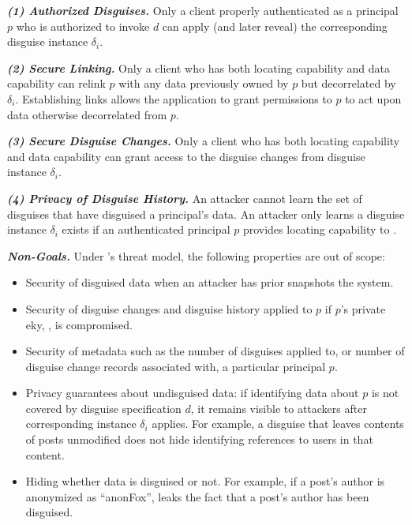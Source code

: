%
\vspace{6pt}\noindent\textbf{\emph{(1) Authorized Disguises.}}
%
Only a client properly authenticated as a principal $p$ who is authorized to invoke $d$ can apply (and
later reveal) the corresponding disguise instance $\delta_i$.
%

%
\vspace{6pt}\noindent\textbf{\emph{(2) Secure Linking.}}
%
Only a client who has both locating capability  and data capability  can relink $p$
with any data previously owned by $p$ but decorrelated by $\delta_i$.
Establishing links allows the application to grant permissions to $p$ to act upon data otherwise
decorrelated from $p$.
%

\vspace{6pt}\noindent\textbf{\emph{(3) Secure Disguise Changes.}}
%
Only a client who has both locating capability  and data capability
 can grant \sys access to the disguise changes from disguise instance $\delta_i$.
%

\vspace{6pt}\noindent\textbf{\emph{(4) Privacy of Disguise History.}}
%
An attacker cannot learn the set of disguises that have disguised a principal's data.
%
An attacker only learns a disguise instance $\delta_i$ exists if an authenticated principal $p$ provides
locating capability  to \sys.

\vspace{6pt}\noindent\textbf{\emph{Non-Goals.}}
%
Under \sys's threat model, the following properties are out of scope:
%
\begin{itemize}
    \item Security of disguised data when an attacker has prior snapshots the system.
    \item Security of disguise changes and disguise history applied to $p$ if $p$'s private eky, , is compromised.
    \item Security of metadata such as the number of disguises applied to, or number of
	disguise change records associated with, a particular principal $p$.
    \item Privacy guarantees about undisguised data: if identifying data about $p$ is not covered by
        disguise specification $d$, it remains visible to attackers after corresponding instance $\delta_i$ applies.
        For example, a disguise that leaves contents of posts unmodified does not hide identifying references
	to users in that content.
    \item Hiding whether data is disguised or not. For example, if a post's author is anonymized as ``anonFox'',
        \sys leaks the fact that a post's author has been disguised.
\end{itemize}

